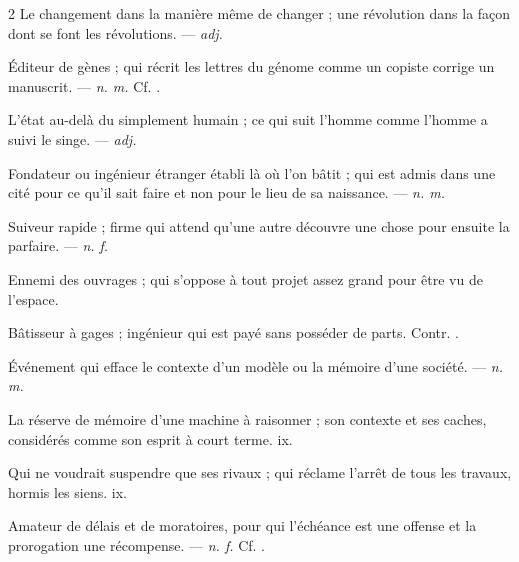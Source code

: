 \begin{multicols}{2}
 Le changement dans la manière même de changer ; une révolution dans la façon dont se font les révolutions. —  \textit{adj.}

 Éditeur de gènes ; qui récrit les lettres du génome comme un copiste corrige un manuscrit. —  \textit{n. m.} Cf. .

 L'état au-delà du simplement humain ; ce qui suit l'homme comme l'homme a suivi le singe. —  \textit{adj.}

 Fondateur ou ingénieur étranger établi là où l'on bâtit ; qui est admis dans une cité pour ce qu'il sait faire et non pour le lieu de sa naissance. —  \textit{n. m.}

 Suiveur rapide ; firme qui attend qu'une autre découvre une chose pour ensuite la parfaire. —  \textit{n. f.}

 Ennemi des ouvrages ; qui s'oppose à tout projet assez grand pour être vu de l'espace.

 Bâtisseur à gages ; ingénieur qui est payé sans posséder de parts. Contr. .

 Événement qui efface le contexte d'un modèle ou la mémoire d'une société. —  \textit{n. m.}

 La réserve de mémoire d'une machine à raisonner ; son contexte et ses caches, considérés comme son esprit à court terme.   ix.

 Qui ne voudrait suspendre que ses rivaux ; qui réclame l'arrêt de tous les travaux, hormis les siens.   ix.

 Amateur de délais et de moratoires, pour qui l'échéance est une offense et la prorogation une récompense. —  \textit{n. f.} Cf. .


\end{multicols}
